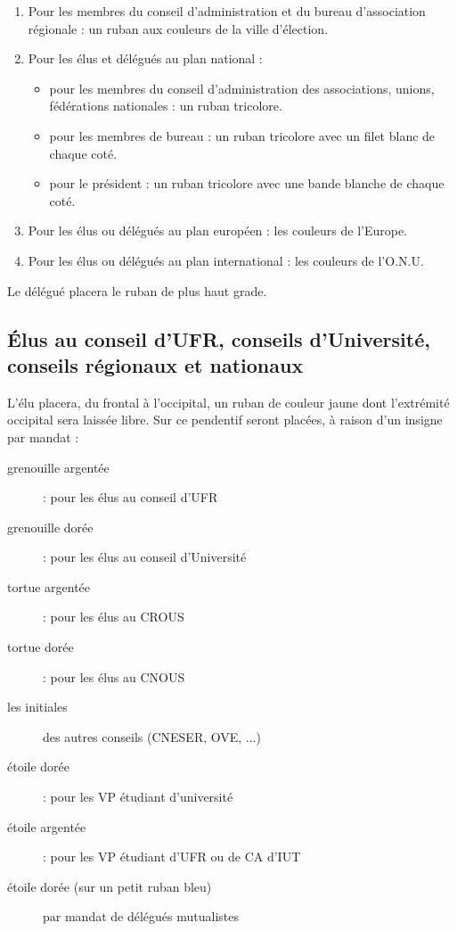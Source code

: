 \begin{enumerate}[a -- ]
\item Pour les membres du conseil d'administration et du bureau d'association régionale : 
un ruban aux couleurs de la ville d'élection.
 
\item Pour les élus et délégués au plan national :
	\begin{itemize}
	\item pour les membres du conseil d'administration des associations, unions,
	fédérations nationales : un ruban tricolore.
	\item pour les membres de bureau : un ruban tricolore avec un filet blanc de chaque
	coté.
	\item pour le président : un ruban tricolore avec une bande blanche de chaque coté.
	\end{itemize}

\item Pour les élus ou délégués au plan européen : 
les couleurs de l'Europe.

\item Pour les élus ou délégués au plan international : 
les couleurs de l'O.N.U.

\end{enumerate}
Le délégué placera le ruban de plus haut grade.


\subsection{Élus au conseil d'UFR, conseils d'Université, conseils régionaux et nationaux}
L'élu placera, du frontal à l'occipital, un ruban de couleur jaune dont l'extrémité
occipital sera laissée libre.
          Sur ce pendentif seront placées, à raison d'un insigne par mandat :

\begin{description}
\item[grenouille argentée]: pour les élus au conseil d'UFR
\item[grenouille dorée]: pour les élus au conseil d'Université
\item[tortue argentée]: pour les élus au CROUS
\item[tortue dorée]: pour les élus au CNOUS
\item[les initiales] des autres conseils (CNESER, OVE, ...)
\item[étoile dorée]: pour les VP étudiant d'université
\item[étoile argentée]: pour les VP étudiant d'UFR ou de CA d'IUT
\item[étoile dorée (sur un petit ruban bleu)] par mandat de délégués mutualistes 
\end{description}


